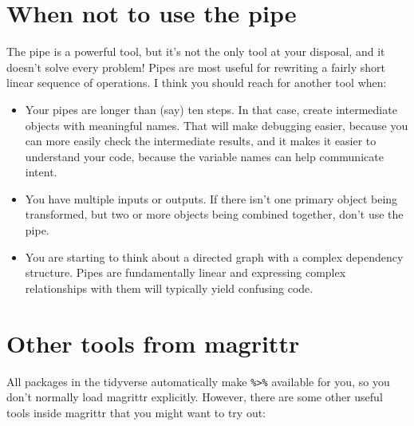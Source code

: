 \documentclass[]{book}
\begin{document}
\section{When not to use the pipe}\label{when-not-to-use-the-pipe}

The pipe is a powerful tool, but it's not the only tool at your
disposal, and it doesn't solve every problem! Pipes are most useful for
rewriting a fairly short linear sequence of operations. I think you
should reach for another tool when:

\begin{itemize}
\item
  Your pipes are longer than (say) ten steps. In that case, create
  intermediate objects with meaningful names. That will make debugging
  easier, because you can more easily check the intermediate results,
  and it makes it easier to understand your code, because the variable
  names can help communicate intent.
\item
  You have multiple inputs or outputs. If there isn't one primary object
  being transformed, but two or more objects being combined together,
  don't use the pipe.
\item
  You are starting to think about a directed graph with a complex
  dependency structure. Pipes are fundamentally linear and expressing
  complex relationships with them will typically yield confusing code.
\end{itemize}

\section{Other tools from magrittr}\label{other-tools-from-magrittr}

All packages in the tidyverse automatically make
\texttt{\%\textgreater{}\%} available for you, so you don't normally
load magrittr explicitly. However, there are some other useful tools
inside magrittr that you might want to try out:
\end{document}
